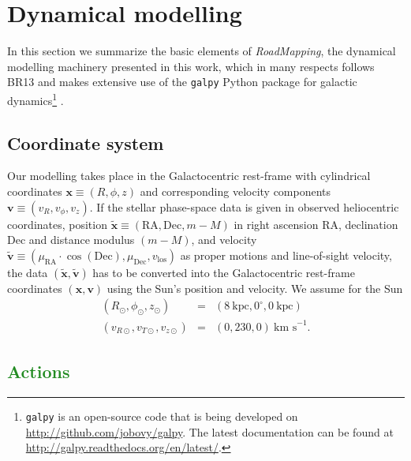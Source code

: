 \documentclass[iop,revtex4,numberedappendix,appendixfloats]{emulateapj}
\newcommand{\vect}[1]{\boldsymbol{#1}}
\newcommand{\RM}{{\sl RoadMapping}}
\newcommand{\NEW}[1]{\textcolor{ForestGreen}{#1}}
\begin{document}
\section{Dynamical modelling}

In this section we summarize the basic elements of \RM{}, the dynamical modelling machinery presented in this work, which in many respects follows BR13 and makes extensive use of the \texttt{galpy} Python package for galactic dynamics\footnote{\texttt{galpy} is an open-source code that is being developed on \url{http://github.com/jobovy/galpy}. The latest documentation can be found at \url{http://galpy.readthedocs.org/en/latest/}.} \citep{2015ApJS..216...29B}.


\subsection{Coordinate system} \label{sec:coordinates}

Our modelling takes place in the Galactocentric rest-frame with cylindrical coordinates $\vect{x} \equiv (R,\phi,z)$ and corresponding velocity components $\vect{v} \equiv (v_R,v_\phi,v_z)$. If the stellar phase-space data is given in observed heliocentric coordinates, position $\tilde{\vect{x}} \equiv(\text{RA},\text{Dec},m-M)$ in right ascension RA, declination Dec and distance modulus $(m-M)$, and velocity $\tilde{\vect{v}} \equiv (\mu_\text{RA} \cdot \cos ( \text{Dec}),\mu_\text{Dec},v_\text{los})$ as proper motions and line-of-sight velocity, the data $(\tilde{\vect{x}},\tilde{\vect{v}})$ has to be converted into the Galactocentric rest-frame coordinates $(\vect{x},\vect{v})$ using the Sun's position and velocity. We assume for the Sun
\begin{eqnarray*}
(R_\odot,\phi_\odot,z_\odot) &=&(8~\text{kpc}, 0^\circ, 0~\text{kpc})\\
(v_{R\odot},v_{T\odot},v_{z\odot}) &=& (0,230,0)~\text{km s}^{-1}.
\end{eqnarray*}


\subsection{\NEW{Actions}}
\end{document}
